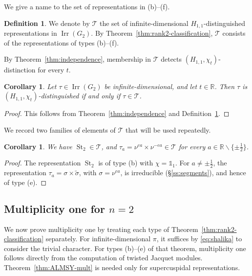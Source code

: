 \documentclass[11pt]{amsart}
\numberwithin{equation}{section}
\theoremstyle{plain}
\newtheorem{corollary}[theorem]{Corollary}
\theoremstyle{definition}
\newtheorem{definition}[theorem]{Definition}
\theoremstyle{remark}
\newcommand{\R}{\mathbb{R}}
\newcommand{\one}{\mathds{1}}
\newcommand{\T}{\mathcal{T}}
\DeclareMathOperator{\Irr}{Irr}
\DeclareMathOperator{\St}{St}
\begin{document}
We give a name to the set of representations in \textup{(b)--(f)}.

\begin{definition}\label{def:T}
	We denote by $\T$ the set of infinite-dimensional $H_{1,1}$-distinguished representations in $\Irr(G_2)$. By Theorem~\ref{thm:rank2-classification}, $\T$ consists of the representations of types \textup{(b)--(f)}.
\end{definition}

By Theorem~\ref{thm:independence}, membership in $\T$ detects $(H_{1,1},\chi_t)$-distinction for every $t$.

\begin{corollary}\label{cor:T-chi-t}
	Let $\tau\in\Irr(G_2)$ be infinite-dimensional, and let $t\in\R$. Then $\tau$ is $(H_{1,1},\chi_t)$-distinguished if and only if $\tau\in\T$.
\end{corollary}

\begin{proof}
	This follows from Theorem~\ref{thm:independence} and Definition~\ref{def:T}.
\end{proof}

We record two families of elements of $\T$ that will be used repeatedly.

\begin{corollary}\label{cor:T-members}
	We have $\St_2\in\T$, and $\tau_a=\nu^{ea}\times\nu^{-ea}\in\T$ for every $a\in\R\smallsetminus\{\pm\frac12\}$.
\end{corollary}

\begin{proof}
	The representation $\St_2$ is of type (b) with $\chi=\one_1$. For $a\ne\pm\frac12$, the representation $\tau_a=\sigma\times\widetilde\sigma$, with $\sigma=\nu^{ea}$, is irreducible (\S\ref{ss:segments}), and hence of type (e).
\end{proof}

\subsection{Multiplicity one for \texorpdfstring{$n=2$}{n=2}}\label{ss:rank2-mult}

We now prove multiplicity one by treating each type of Theorem~\ref{thm:rank2-classification} separately. For infinite-dimensional $\pi$, it suffices by \eqref{eq:shalika} to consider the trivial character. For types \textup{(b)--(e)} of that theorem, multiplicity one follows directly from the computation of twisted Jacquet modules. Theorem~\ref{thm:ALMSY-mult} is needed only for supercuspidal representations.
\end{document}
